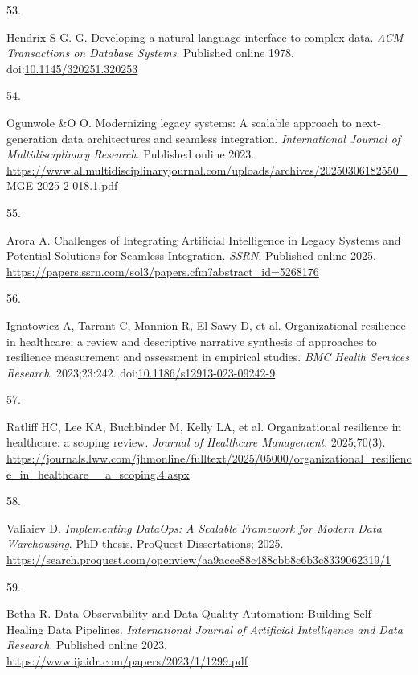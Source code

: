 \documentclass[
  american,
  11pt,
  letterpaper,
  oneside  ,captions=tableheading
]{scrartcl}
\newlength{\cslhangindent}
\newlength{\csllabelwidth}
\newenvironment{CSLReferences}[2] %
 {\begin{list}{}{%
  \setlength{\itemindent}{0pt}
  \setlength{\leftmargin}{0pt}
  \setlength{\parsep}{0pt}
  \ifodd #1
   \setlength{\leftmargin}{\cslhangindent}
   \setlength{\itemindent}{-1\cslhangindent}
  \fi
  \setlength{\itemsep}{#2\baselineskip}}}
 {\end{list}}
\newcommand{\CSLLeftMargin}[1]{\parbox[t]{\csllabelwidth}{\strut#1\strut}}
\newcommand{\CSLRightInline}[1]{\parbox[t]{\linewidth - \csllabelwidth}{\strut#1\strut}}
\begin{document}
\begin{CSLReferences}{0}{1}
\CSLLeftMargin{53. }%
\CSLRightInline{Hendrix S G. G. {Developing a natural language interface
to complex data}. \emph{{ACM} Transactions on Database Systems}.
Published online 1978.
doi:\href{https://doi.org/10.1145/320251.320253}{10.1145/320251.320253}}

\CSLLeftMargin{54. }%
\CSLRightInline{Ogunwole \&O O. {Modernizing legacy systems: A scalable
approach to next-generation data architectures and seamless
integration}. \emph{International Journal of Multidisciplinary
Research}. Published online 2023.
\url{https://www.allmultidisciplinaryjournal.com/uploads/archives/20250306182550_MGE-2025-2-018.1.pdf}}

\CSLLeftMargin{55. }%
\CSLRightInline{Arora A. {Challenges of Integrating Artificial
Intelligence in Legacy Systems and Potential Solutions for Seamless
Integration}. \emph{{SSRN}}. Published online 2025.
\url{https://papers.ssrn.com/sol3/papers.cfm?abstract_id=5268176}}

\CSLLeftMargin{56. }%
\CSLRightInline{{Ignatowicz A, Tarrant C, Mannion R, El-Sawy D, et al.}
{Organizational resilience in healthcare: a review and descriptive
narrative synthesis of approaches to resilience measurement and
assessment in empirical studies}. \emph{BMC Health Services Research}.
2023;23:242.
doi:\href{https://doi.org/10.1186/s12913-023-09242-9}{10.1186/s12913-023-09242-9}}

\CSLLeftMargin{57. }%
\CSLRightInline{{Ratliff HC, Lee KA, Buchbinder M, Kelly LA, et al.}
{Organizational resilience in healthcare: a scoping review}.
\emph{Journal of Healthcare Management}. 2025;70(3).
\url{https://journals.lww.com/jhmonline/fulltext/2025/05000/organizational_resilience_in_healthcare__a_scoping.4.aspx}}

\CSLLeftMargin{58. }%
\CSLRightInline{Valiaiev D. \emph{{Implementing DataOps: A Scalable
Framework for Modern Data Warehousing}}. PhD thesis. ProQuest
Dissertations; 2025.
\url{https://search.proquest.com/openview/aa9acce88c488cbb8c6b3c8339062319/1}}

\CSLLeftMargin{59. }%
\CSLRightInline{Betha R. {Data Observability and Data Quality
Automation: Building Self-Healing Data Pipelines}. \emph{International
Journal of Artificial Intelligence and Data Research}. Published online
2023. \url{https://www.ijaidr.com/papers/2023/1/1299.pdf}}


\end{CSLReferences}
\end{document}
